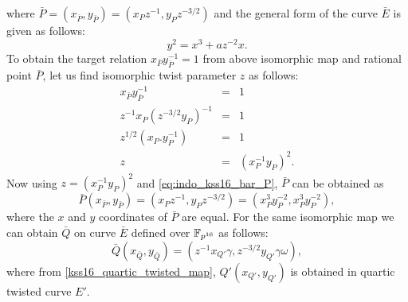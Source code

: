 where $\bar P = (x_{\bar P}, y_{\bar P}) = (x_P z^{-1},y_P z^{-3/2})$ and the general form of the curve $\bar E$ is given as follows:
\begin{equation}\label{eq:indo_kss16_isomorphic_E_bar}
y^2 = x^3+az^{-2}x.
\end{equation}
To obtain the target relation $x_{\bar P}y_{\bar P}^{-1} = 1$ from  above isomorphic map and rational point $\bar P$, let us find isomorphic twist parameter $z$ as follows:
\begin{eqnarray}
x_{\bar P}y_{\bar P}^{-1}& =& 1 \nonumber \\
z^{-1}x_P (z^{-3/2}y_P)^{-1} &=& 1 \nonumber \\
z^{1/2}(x_P.y_P^{-1})&=&1\nonumber \\
z &= &(x_P^{-1}y_P)^2.
\end{eqnarray}
Now using $z = (x_P^{-1}y_P)^2$ and \eqref{eq:indo_kss16_bar_P}, $\bar P$ can be obtained as
\begin{equation}
\bar{P}(x_{\bar{P}}, y_{\bar{P}})= (x_P z^{-1},y_P z^{-3/2})=(x_P^3y_P^{-2},x_P^3y_P^{-2}),
\end{equation}
where the $x$ and $y$ coordinates of $\bar{P}$ are equal. For the same isomorphic map we can obtain $\bar{Q}$ on curve $\bar{E}$ defined over $\mathbb{F}_{p^{16}}$ as follows:
\begin{equation} \label{eq:indo_kss16_Q_bar}
\bar{Q}(x_{\bar{Q}}, y_{\bar{Q}}) = (z^{-1}x_{Q'}\gamma, z^{-3/2}y_{Q'}\gamma \omega),
\end{equation} 
where from \eqref{kss16_quartic_twisted_map}, $Q'(x_{Q'},y_{Q'})$ is obtained in quartic twisted curve $E'$. 

